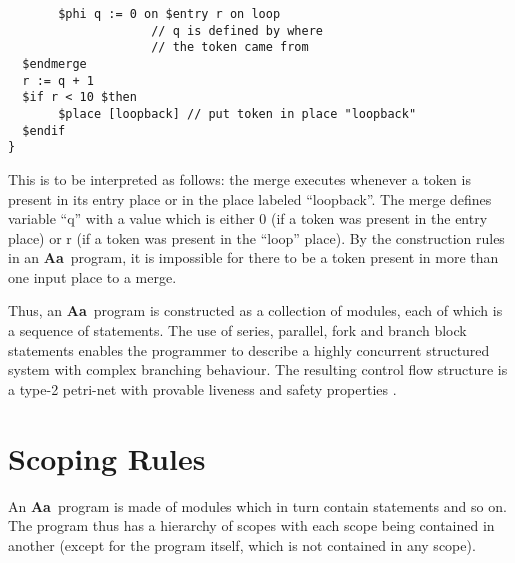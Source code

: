 \documentclass{article}
\newcommand{\Aa}{{\bf Aa}~}
\begin{document}
\begin{itemize}
\begin{verbatim}
       $phi q := 0 on $entry r on loop 
                    // q is defined by where 
                    // the token came from
  $endmerge
  r := q + 1
  $if r < 10 $then 
       $place [loopback] // put token in place "loopback"
  $endif
}
\end{verbatim}
This is to be interpreted as follows: the merge executes
whenever a token is present in its entry place  or in 
the place labeled ``loopback''.
The merge defines variable ``q'' with a value which is
either 0 (if a token was present in the entry place)
or r (if a token was present in the ``loop'' place).
By the construction rules in an \Aa program, it is
impossible for there to be a token present in more
than one input place to a merge.
\end{itemize}

Thus, an \Aa program is constructed as a collection of modules,
each of which is a sequence of statements.  The use of series,
parallel, fork and branch block
statements enables the programmer to describe a highly concurrent
structured system with complex branching behaviour.  
The resulting control flow structure is a
type-2 petri-net with provable liveness and safety properties \cite{ref:SameerPhD}.

\section{Scoping Rules} \label{sec:Scopes}

An \Aa program is made of modules which in turn contain statements
and so on.  The program thus has a hierarchy of scopes with each
scope being contained in another (except for the program itself,
which is not contained in any scope).
\end{document}

